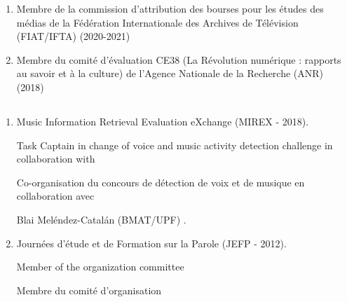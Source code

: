 \begin{fr}
\begin{enumerate}[nosep,after=\strut, leftmargin=1em, itemsep=3pt]
\item Membre de la commission d'attribution des bourses pour les études des médias de la Fédération Internationale des Archives de Télévision (FIAT/IFTA) (2020-2021)
\item Membre du comité d'évaluation CE38 (La Révolution numérique : rapports au savoir et à la culture) de l'Agence Nationale de la Recherche (ANR) (2018)
\end{enumerate}
\end{fr}

\subsection{\EvalAnim}
\begin{enumerate}[nosep,after=\strut, leftmargin=1em, itemsep=3pt]
\item Music Information Retrieval Evaluation eXchange (MIREX - 2018).
\begin{en}Task Captain in change of voice and music activity detection challenge in collaboration with\end{en}
\begin{fr}
Co-organisation du concours de détection de voix et de musique en collaboration avec
\end{fr}
Blai Meléndez-Catalán (BMAT/UPF) .
\item Journées d’étude et de Formation sur la Parole (JEFP - 2012).
\begin{en}Member of the organization committee \end{en}
\begin{fr}Membre du comité d'organisation \end{fr}
\end{enumerate}







\section{\PubSec}

